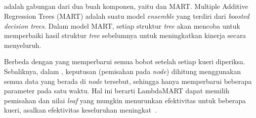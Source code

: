 \subsection{\lambdamart{}}
\label{subbab:2:LambdaMART}
\lambdamart{} adalah gabungan dari dua buah komponen, yaitu \lambdarank{} dan MART. Multiple Additive Regression Trees (MART) adalah suatu model \textit{ensemble} yang terdiri dari \textit{boosted decision trees}. Dalam model MART, setiap struktur \textit{tree} akan mencoba untuk memperbaiki hasil struktur \textit{tree} sebelumnya untuk meningkatkan kinerja secara menyeluruh. 

Berbeda dengan \lambdarank{} yang memperbarui semua bobot setelah setiap kueri diperiksa. Sebaliknya, dalam \lambdamart{}, keputusan (pemisahan pada \textit{node}) dihitung menggunakan semua data yang berada di \textit{node} tersebut, sehingga \lambdamart{} hanya memperbarui beberapa parameter pada satu waktu. Hal ini berarti LambdaMART dapat memilih pemisahan dan nilai \textit{leaf} yang mungkin menurunkan efektivitas untuk beberapa kueri, asalkan efektivitas keseluruhan meningkat~\citep{burges2010ranknet}.

